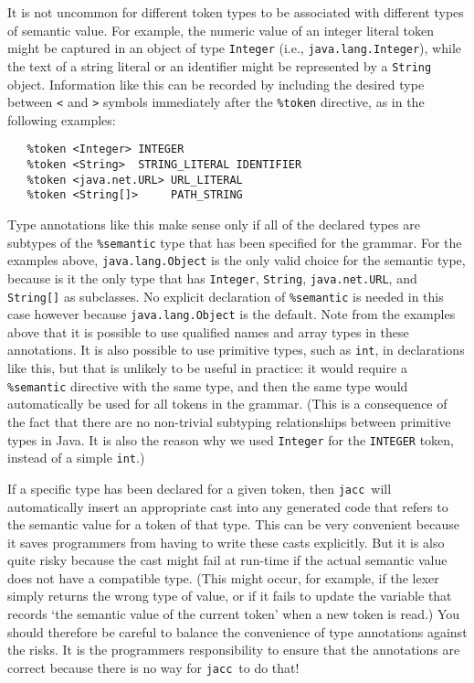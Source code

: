 \documentclass[12pt]{article}
\def\jacc{{\tt jacc}}
\begin{document}
\begin{itemize}
      It is not uncommon for different token types to be
      associated with different types of semantic value.
      For example, the numeric value of an integer literal token
      might be captured in an object of type \verb"Integer"
      (i.e., \verb"java.lang.Integer"), while the text of a
      string literal or an identifier might be represented by a
      \verb"String" object.  Information like this can be
      recorded by including the desired type between \verb"<" and
      \verb">" symbols immediately after the \verb"%token" directive,
      as in the following examples:
\begin{verbatim}
   %token <Integer> INTEGER
   %token <String>  STRING_LITERAL IDENTIFIER
   %token <java.net.URL> URL_LITERAL
   %token <String[]>     PATH_STRING
\end{verbatim}
      Type annotations like this make sense only if all of the
      declared types are subtypes of the \verb"%semantic" type
      that has been specified for the grammar.  For the examples
      above, \verb"java.lang.Object" is the only valid choice
      for the semantic type, because is it the only type that
      has \verb"Integer", \verb"String", \verb"java.net.URL",
      and \verb"String[]" as subclasses.  No explicit declaration
      of \verb"%semantic" is needed in this case however because
      \verb"java.lang.Object" is the default.  Note from the
      examples above that it is possible to use qualified names
      and array types in these annotations.  It is also possible
      to use primitive types, such as \verb"int", in declarations
      like this, but that is unlikely to be useful in practice:
      it would require a \verb"%semantic" directive with the
      same type, and then the same type would automatically be
      used for all tokens in the grammar.  (This is a consequence
      of the fact that there are no non-trivial subtyping relationships
      between primitive types in Java.  It is also the reason why we
      used \verb"Integer" for the \verb"INTEGER" token, instead
      of a simple \verb"int".)

      If a specific type has been declared for a given token, then
      \jacc\ will automatically insert an appropriate cast into any
      generated code that refers to the semantic value for a token
      of that type.  This can be very convenient because it saves
      programmers from having to write these casts explicitly.  But
      it is also quite risky because the cast might fail at run-time
      if the actual semantic value does not have a compatible type.
      (This might occur, for example, if the lexer simply returns
      the wrong type of value, or if it fails to update the variable
      that records `the semantic value of the current token' when a
      new token is read.)  You should therefore be careful to balance
      the convenience of type annotations against the risks.  It is
      the programmers responsibility to ensure that the annotations
      are correct because there is no way for \jacc\ to do that!


\end{itemize}
\end{document}
